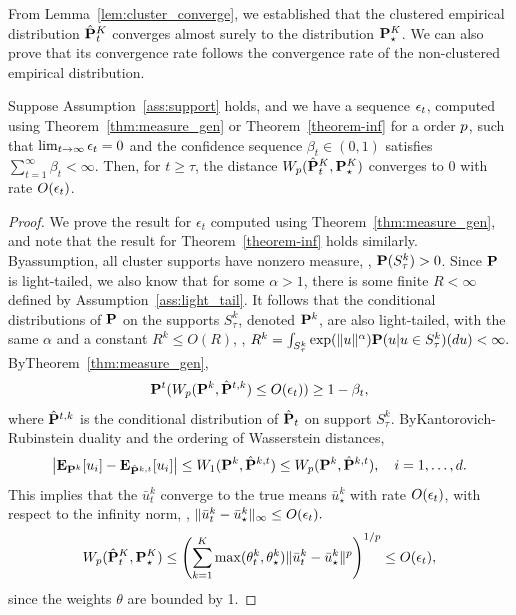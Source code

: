 From Lemma~\ref{lem:cluster_converge}, we established that the clustered empirical distribution $\hat{{\mathbf P}}^K_t$ converges almost surely to the distribution ${\mathbf P}^K_\star$. We can also prove that its convergence rate follows the convergence rate of the non-clustered empirical distribution. 
\begin{theorem}
\label{lem:conditional_Conv}
Suppose Assumption~\ref{ass:support} holds, and we have a sequence $\epsilon_t$, computed using Theorem~\ref{thm:measure_gen} or Theorem~\ref{theorem-inf} for a order $p$, such that $\lim_{t \rightarrow \infty} \epsilon_t = 0$ and the confidence sequence $\beta_t \in (0,1)$ satisfies $\sum_{t=1}^\infty {\beta_t < \infty}$. Then, for $t \geq \tau$, the distance $W_{p}(\hat{{\mathbf P}}^K_t,{\mathbf P}^K_\star)$ converges to 0 with rate $O(\epsilon_t)$.
\end{theorem}
\begin{proof}
    We prove the result for $\epsilon_t$ computed using Theorem~\ref{thm:measure_gen}, and note that the result for Theorem~\ref{theorem-inf} holds similarly.
    Byassumption, all cluster supports have nonzero measure, \ie, ${\mathbf P}(S^k_\tau) > 0$. 
    Since ${\mathbf P}$ is light-tailed, we also know that for some $\alpha > 1$, there is some finite $R <\infty$ defined by Assumption~\ref{ass:light_tail}.
    It follows that the conditional distributions of ${\mathbf P}$ on the supports $S^k_\tau$, denoted ${\mathbf P}^k$, are also light-tailed, with the same $\alpha$ and a constant $R^k \leq O(R)$, \ie,
    $R^k = \int_{S_\tau^k} \exp(\|u\|^{\alpha}){\mathbf P}(u|u\in S^k_\tau)(du) < \infty.$
    ByTheorem~\ref{thm:measure_gen},
    $${\mathbf P}^{t}(W_{p}({\mathbf P}^k,\hat{{\mathbf P}}^{t,k})\leq O(\epsilon_t)) \geq 1-\beta_t,$$
    where $\hat{{\mathbf P}}^{t,k}$ is the conditional distribution of $\hat{{\mathbf P}}_t$ on support $S^k_\tau$.
    ByKantorovich-Rubinstein duality and the ordering of Wasserstein distances, 
    $$\left|\mathbf{E}_{{\mathbf P}^k}[u_i] - \mathbf{E}_{\hat{{\mathbf P}}^{k,t}}[u_i] \right| \leq W_1({\mathbf P}^k,\hat{{\mathbf P}}^{k,t}) \leq W_{p}({\mathbf P}^k,\hat{{\mathbf P}}^{k,t}), \quad i =1,\dots,d.$$
    This implies that the  $\bar{u}^k_t$ converge to the true means $\bar{u}^k_\star$ with rate $O(\epsilon_t)$, with respect to the infinity norm, \ie, 
    $\| \bar{u}^k_t - \bar{u}^k_\star\|_\infty \leq O(\epsilon_t).$
    $$W_{p}(\hat{{\mathbf P}}^K_t,{\mathbf P}^K_\star) \leq \left(\sum_{k=1}^K\max(\theta^k_t,\theta^k_\star) \| \bar{u}^k_t - \bar{u}^k_\star\|^{p}\right)^{1/{p}} \leq O(\epsilon_t),$$
    since the weights $\theta$ are bounded by 1. 
\end{proof}

